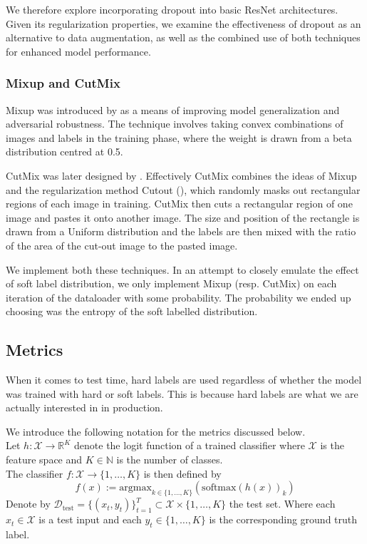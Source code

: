 \documentclass{article}
\begin{document}
We therefore explore incorporating dropout into basic ResNet architectures. Given its regularization properties, we examine the effectiveness of dropout as an alternative to data augmentation, as well as the combined use of both techniques for enhanced model performance.
\subsubsection*{Mixup and CutMix}
Mixup was introduced by \cite{zhang2018mixupempiricalriskminimization} as a means of improving model generalization and adversarial robustness. The technique involves taking convex combinations of images and labels in the training phase, where the weight is drawn from a beta distribution centred at 0.5. 

CutMix was later designed by \cite{yun2019cutmixregularizationstrategytrain}. Effectively CutMix combines the ideas of Mixup and the regularization method Cutout (\cite{devries2017improvedregularizationconvolutionalneural}), which randomly masks out rectangular regions of each image in training. CutMix then cuts a rectangular region of one image and pastes it onto another image. The size and position of the rectangle is drawn from a Uniform distribution and the labels are then mixed with the ratio of the area of the cut-out image to the pasted image. 

We implement both these techniques. In an attempt to closely emulate the effect of soft label distribution, we only implement Mixup (resp. CutMix) on each iteration of the dataloader with some probability. The probability we ended up choosing was the entropy of the soft labelled distribution. 
\subsection{Metrics}
When it comes to test time, hard labels are used regardless of whether the model was trained with hard or soft labels. This is because hard labels are what we are actually interested in in production. 

We introduce the following notation for the metrics discussed below. \\
Let $h:\mathcal{X} \to \mathbb{R}^K$ denote the logit function of a trained classifier where $\mathcal{X}$ is the feature space and $K\in \mathbb{N}$ is the number of classes. \\
The classifier $f:\mathcal{X} \to \{1,\ldots,K\}$ is then defined by
\[
f(x) := \text{argmax}_{k\in\{1,\ldots,K\} }(\text{softmax}(h(x))_k)
\] 
Denote by $\mathcal{D}_{\text{test}} = \{(x_t, y_t)\}_{t=1} ^ {T} \subset \mathcal{X} \times \{1,\ldots,K\} $ the test set.  Where each $x_t\in\mathcal{X}$ is a test input and each $y_t\in\{1,\ldots,K\} $ is the corresponding ground truth label. 
\end{document}
